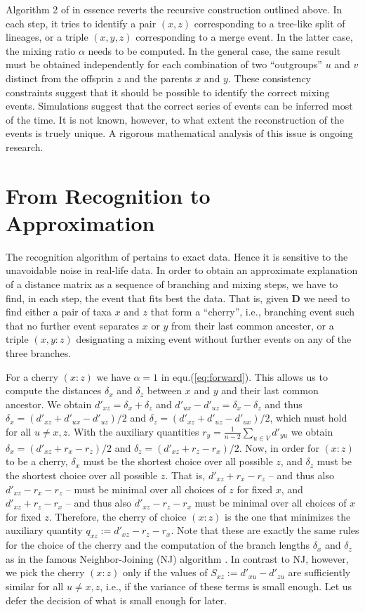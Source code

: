 \documentclass[amsmath]{lni}
\begin{document}
Algorithm 2 of \cite{Prohaska:18a} in essence reverts the recursive
construction outlined above. In each step, it tries to identify a pair
$(x,z)$ corresponding to a tree-like split of lineages, or a triple
$(x,y,z)$ corresponding to a merge event. In the latter case, the mixing
ratio $\alpha$ needs to be computed. In the general case, the same result
must be obtained independently for each combination of two ``outgroups''
$u$ and $v$ distinct from the offsprin $z$ and the parents $x$ and
$y$. These consistency constraints suggest that it should be possible to
identify the correct mixing events. Simulations \cite{Prohaska:18a} suggest
that the correct series of events can be inferred most of the time. It is
not known, however, to what extent the reconstruction of the events is
truely unique. A rigorous mathematical analysis of this issue is ongoing
research.

\section{From Recognition to Approximation} 

The recognition algorithm of \cite{Prohaska:18a} pertains to exact
data. Hence it is sensitive to the unavoidable noise in real-life data.  In
order to obtain an approximate explanation of a distance matrix as a
sequence of branching and mixing steps, we have to find, in each step, the
event that fits best the data. That is, given $\textbf{D}$ we need to find
either a pair of taxa $x$ and $z$ that form a ``cherry'', i.e., branching
event such that no further event separates $x$ or $y$ from their last
common ancester, or a triple $(x,y:z)$ designating a mixing event without
further events on any of the three branches. 

For a cherry $(x:z)$ we have $\alpha=1$ in equ.(\ref{eq:forward}). This
allows us to compute the distances $\delta_x$ and $\delta_z$ between $x$
and $y$ and their last common ancestor. We obtain
$d'_{xz}=\delta_x+\delta_z$ and $d'_{ux}-d'_{uz}=\delta_x-\delta_z$ and
thus $\delta_x=(d'_{xz}+d'_{ux}-d'_{uz})/2$ and
$\delta_z=(d'_{xz}+d'_{uz}-d'_{ux})/2$, which must hold for all $u\ne x,z$.
With the auxiliary quantities $r_y=\frac{1}{n-2}\sum_{u\in V} d'_{yu}$ we
obtain $\delta_x=(d'_{xz}+r_x-r_z)/2$ and
$\delta_z=(d'_{xz}+r_z-r_x)/2$. Now, in order for $(x:z)$ to be a cherry,
$\delta_x$ must be the shortest choice over all possible $z$, and
$\delta_z$ must be the shortest choice over all possible $z$. That is,
$d'_{xz}+r_x-r_z$ -- and thus also $d'_{xz}-r_x-r_z$ -- must be minimal
over all choices of $z$ for fixed $x$, and $d'_{xz}+r_z-r_x$ -- and thus
also $d'_{xz}-r_z-r_x$ must be minimal over all choices of $x$ for fixed
$z$. Therefore, the cherry of choice $(x:z)$ is the one that minimizes the
auxiliary quantity $q_{xz}:= d'_{xz}-r_z-r_x$. Note that these are exactly
the same rules for the choice of the cherry and the computation of the
branch lengths $\delta_x$ and $\delta_z$ as in the famous Neighbor-Joining
(NJ) algorithm \cite{Saitou:87}. In contrast to NJ, however, we pick the
cherry $(x:z)$ only if the values of $S_{xz}:=d'_{xu}-d'_{zu}$ are
sufficiently similar for all $u\ne x,z$, i.e., if the variance of these
terms is small enough. Let us defer the decision of what is small enough
for later.
\end{document}
